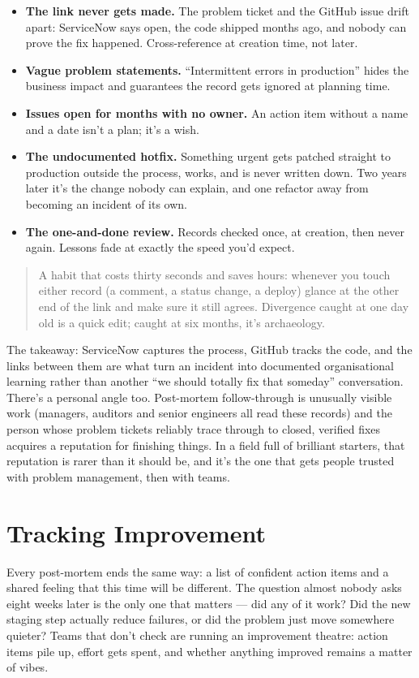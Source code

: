 \begin{itemize}[leftmargin=*]
\item \textbf{The link never gets made.} The problem ticket and the GitHub issue drift apart: ServiceNow says open, the code shipped months ago, and nobody can prove the fix happened. Cross-reference at creation time, not later.
\item \textbf{Vague problem statements.} ``Intermittent errors in production'' hides the business impact and guarantees the record gets ignored at planning time.
\item \textbf{Issues open for months with no owner.} An action item without a name and a date isn't a plan; it's a wish.
\item \textbf{The undocumented hotfix.} Something urgent gets patched straight to production outside the process, works, and is never written down. Two years later it's the change nobody can explain, and one refactor away from becoming an incident of its own.
\item \textbf{The one-and-done review.} Records checked once, at creation, then never again. Lessons fade at exactly the speed you'd expect.
\end{itemize}


\begin{quote}\small
A habit that costs thirty seconds and saves hours: whenever you touch either record (a comment, a status change, a deploy) glance at the other end of the link and make sure it still agrees. Divergence caught at one day old is a quick edit; caught at six months, it's archaeology.
\end{quote}


The takeaway: ServiceNow captures the process, GitHub tracks the code, and the links between them are what turn an incident into documented organisational learning rather than another ``we should totally fix that someday'' conversation. There's a personal angle too. Post-mortem follow-through is unusually visible work (managers, auditors and senior engineers all read these records) and the person whose problem tickets reliably trace through to closed, verified fixes acquires a reputation for finishing things. In a field full of brilliant starters, that reputation is rarer than it should be, and it's the one that gets people trusted with problem management, then with teams.

\section{Tracking Improvement}
Every post-mortem ends the same way: a list of confident action items and a shared feeling that this time will be different. The question almost nobody asks eight weeks later is the only one that matters — did any of it work? Did the new staging step actually reduce failures, or did the problem just move somewhere quieter? Teams that don't check are running an improvement theatre: action items pile up, effort gets spent, and whether anything improved remains a matter of vibes.


